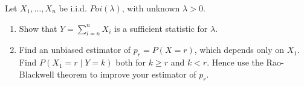 
\begin{exercise}

Let $X_1, \dots, X_n$ be i.i.d. $\mathit{Poi}(\lambda)$, with unknown $\lambda > 0$.

\begin{enumerate}[label = (\alph*)]

    \item Show that $Y = \sum_{i=n}^n X_i$ is a sufficient statistic for $\lambda$.

    \item Find an unbiased estimator of $p_r = P(X = r)$, which depends only on $X_1$.
    Find $P(X_1 = r \mid Y = k)$ both for $k \geq r$ and $k < r$.
    Hence use the Rao-Blackwell theorem to improve your estimator of $p_r$.

\end{enumerate}

\end{exercise}


